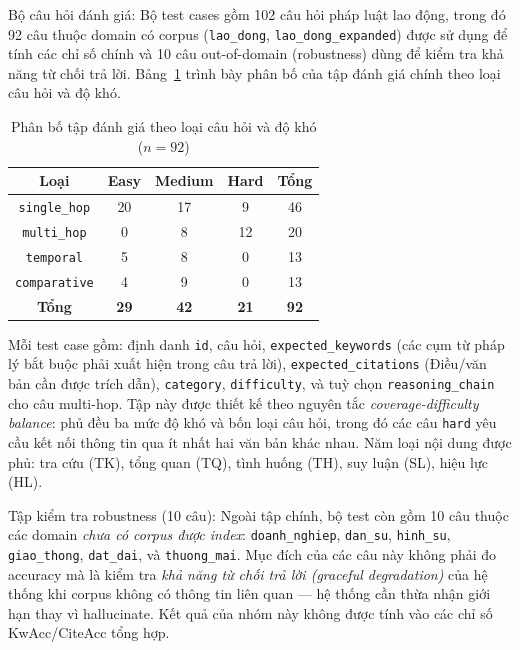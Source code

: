 \documentclass[../DoAn.tex]{subfiles}
\begin{document}
Bộ câu hỏi đánh giá: Bộ test cases gồm 102 câu hỏi pháp luật lao động, trong đó 92 câu thuộc domain có corpus (\texttt{lao\_dong}, \texttt{lao\_dong\_expanded}) được sử dụng để tính các chỉ số chính và 10 câu out-of-domain (robustness) dùng để kiểm tra khả năng từ chối trả lời. Bảng~\ref{table:test_cases_main} trình bày phân bố của tập đánh giá chính theo loại câu hỏi và độ khó.

\begin{table}[H]
\centering
\caption{Phân bố tập đánh giá theo loại câu hỏi và độ khó ($n = 92$)}
\label{table:test_cases_main}
\small
\begin{tabular}{|c|c|c|c|c|}
\hline
\textbf{Loại} & \textbf{Easy} & \textbf{Medium} & \textbf{Hard} & \textbf{Tổng} \\
\hline
\texttt{single\_hop} & 20 & 17 & 9  & 46 \\
\texttt{multi\_hop}  & 0  & 8  & 12 & 20 \\
\texttt{temporal}    & 5  & 8  & 0  & 13 \\
\texttt{comparative} & 4  & 9  & 0  & 13 \\
\hline
\textbf{Tổng} & \textbf{29} & \textbf{42} & \textbf{21} & \textbf{92} \\
\hline
\end{tabular}
\end{table}

Mỗi test case gồm: định danh \texttt{id}, câu hỏi, \texttt{expected\_keywords} (các cụm từ pháp lý bắt buộc phải xuất hiện trong câu trả lời), \texttt{expected\_citations} (Điều/văn bản cần được trích dẫn), \texttt{category}, \texttt{difficulty}, và tuỳ chọn \texttt{reasoning\_chain} cho câu multi-hop. Tập này được thiết kế theo nguyên tắc \emph{coverage-difficulty balance}: phủ đều ba mức độ khó và bốn loại câu hỏi, trong đó các câu \texttt{hard} yêu cầu kết nối thông tin qua ít nhất hai văn bản khác nhau. Năm loại nội dung được phủ: tra cứu (TK), tổng quan (TQ), tình huống (TH), suy luận (SL), hiệu lực (HL).

Tập kiểm tra robustness (10 câu): Ngoài tập chính, bộ test còn gồm 10 câu thuộc các domain \emph{chưa có corpus được index}: \texttt{doanh\_nghiep}, \texttt{dan\_su}, \texttt{hinh\_su}, \texttt{giao\_thong}, \texttt{dat\_dai}, và \texttt{thuong\_mai}. Mục đích của các câu này không phải đo accuracy mà là kiểm tra \emph{khả năng từ chối trả lời (graceful degradation)} của hệ thống khi corpus không có thông tin liên quan --- hệ thống cần thừa nhận giới hạn thay vì hallucinate. Kết quả của nhóm này không được tính vào các chỉ số KwAcc/CiteAcc tổng hợp.
\end{document}
